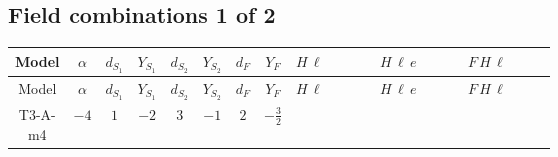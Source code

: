 \documentclass[8pt]{article}
\begin{document}
\begin{landscape}
\subsection*{Field combinations 1 of 2}
\begin{longtable}{@{}cccccccc >{\raggedright\arraybackslash}p{0.21\linewidth} >{\raggedright\arraybackslash}p{0.21\linewidth} >{\raggedright\arraybackslash}p{0.21\linewidth}@{}}
\toprule
Model & $\alpha$ & $d_{S_1}$ & $Y_{S_1}$ & $d_{S_2}$ & $Y_{S_2}$ & $d_F$ & $Y_F$ & $H\,\ell$ & $H\,\ell\,e$ & $F\,H\,\ell$ \\
\midrule
\endfirsthead
\toprule
Model & $\alpha$ & $d_{S_1}$ & $Y_{S_1}$ & $d_{S_2}$ & $Y_{S_2}$ & $d_F$ & $Y_F$ & $H\,\ell$ & $H\,\ell\,e$ & $F\,H\,\ell$ \\
\midrule
\endhead
T3-A-m4 & $-4$ & $1$ & $-2$ & $3$ & $-1$ & $2$ & $-\frac{3}{2}$ & \scriptsize\adjustbox{max width=\linewidth}{$\begin{gathered} +\frac{2 \hbar  \overline{y_{1,i_1,r_1}} \overline{y_{2,i_2,r_1}} L_{a_4,i_2}{}^T\, C\, P_L\, L_{a_2,i_1} H_{a_1} H_{a_3} \lambda_5 \epsilon_{a_1,a_2} \epsilon_{a_3,a_4}}{\sqrt{3} \epsilon  M_F} \\ +\frac{2 \hbar  \overline{y_{1,i_1,r_1}} \overline{y_{2,i_2,r_1}} L_{a_4,i_2}{}^T\, C\, P_L\, L_{a_2,i_1} H_{a_1} H_{a_3} \lambda_5 \epsilon_{a_1,a_2} \epsilon_{a_3,a_4}}{\sqrt{3} M_F} \\ +\frac{2 \hbar  \overline{\lambda_5} \overline{L_{a_3,i_1}}\, C\, P_R\, \overline{L_{a_4,i_2}}{}^T y_{1,i_1,r_1} y_{2,i_2,r_1} \epsilon_{a_1,a_3} \epsilon_{a_2,a_4} H_{a_1}{}^{\dagger } H_{a_2}{}^{\dagger }}{\sqrt{3} \epsilon  M_F}\end{gathered}$} & \scriptsize\adjustbox{max width=\linewidth}{$\begin{gathered} \frac{\hbar  \overline{y_{1,i_3,r_1}} \overline{L_{a_1,i_2}}\, P_R\, e_{i_1} H_{a_1} y_{1,i_2,r_1} Y_{e,i_3,i_1}}{4 \epsilon } \\ +\frac{3}{8} \hbar  \overline{y_{1,i_3,r_1}} \overline{L_{a_1,i_2}}\, P_R\, e_{i_1} H_{a_1} y_{1,i_2,r_1} Y_{e,i_3,i_1} \\ +\frac{\sqrt{3} \hbar  \overline{y_{2,i_3,r_1}} \overline{L_{a_1,i_2}}\, P_R\, e_{i_1} H_{a_1} y_{2,i_2,r_1} Y_{e,i_3,i_1}}{4 \epsilon }\end{gathered}$} & \scriptsize\adjustbox{max width=\linewidth}{$\begin{gathered} +\frac{2 \hbar  \log \left(\frac{\bar{\mu}^{2}}{M_F^2}\right) \overline{y_{1,i_1,r_1}} \overline{y_{2,i_2,r_1}} L_{a_4,i_2}{}^T\, C\, P_L\, L_{a_2,i_1} H_{a_1} H_{a_3} \lambda_5 \epsilon_{a_1,a_2} \epsilon_{a_3,a_4}}{\sqrt{3} M_F} \\ +\frac{2 \hbar  \log \left(\frac{\bar{\mu}^{2}}{M_F^2}\right) \overline{\lambda_5} \overline{L_{a_3,i_1}}\, C\, P_R\, \overline{L_{a_4,i_2}}{}^T y_{1,i_1,r_1} y_{2,i_2,r_1} \epsilon_{a_1,a_3} \epsilon_{a_2,a_4} H_{a_1}{}^{\dagger } H_{a_2}{}^{\dagger }}{\sqrt{3} M_F}\end{gathered}$} \\

\end{longtable}
\end{landscape}
\end{document}
